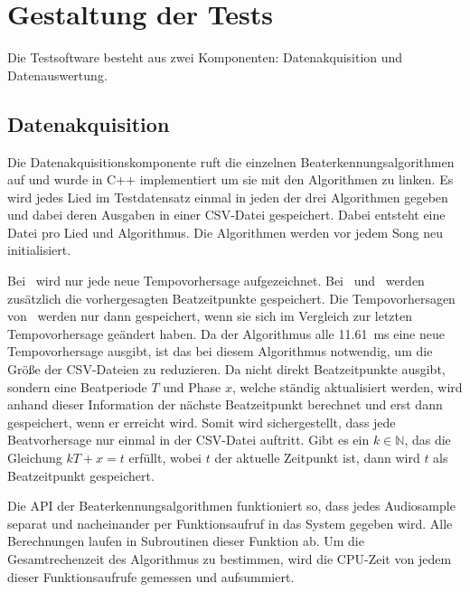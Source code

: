 \section{Gestaltung der Tests} \label{konzept/gestaltung}
{
	Die Testsoftware besteht aus zwei Komponenten:
		Datenakquisition und Datenauswertung.

	\subsection{Datenakquisition}
	{
		Die Datenakquisitionskomponente ruft die einzelnen Beaterkennungsalgorithmen auf
			und wurde in C++ implementiert
			um sie mit den Algorithmen zu linken.
		Es wird jedes Lied im Testdatensatz einmal in jeden der drei Algorithmen gegeben
			und dabei deren Ausgaben in einer CSV-Datei gespeichert.
		Dabei entsteht eine Datei pro Lied und Algorithmus.
		Die Algorithmen werden vor jedem Song neu initialisiert.

		Bei~\cite{2001_BeatThis} wird nur jede neue Tempovorhersage aufgezeichnet.
		Bei~\cite{2009_DaPlSt} und~\cite{2011_PlRoSt} werden zusätzlich die vorhergesagten Beatzeitpunkte gespeichert.
		Die Tempovorhersagen von~\cite{2011_PlRoSt} werden nur dann gespeichert,
			wenn sie sich im Vergleich zur letzten Tempovorhersage geändert haben.
		Da der Algorithmus alle \SI{11.61}{\milli\second} eine neue Tempovorhersage ausgibt,
			ist das bei diesem Algorithmus notwendig,
			um die Grö{\ss}e der CSV-Dateien zu reduzieren.
		Da \cite{2011_PlRoSt} nicht direkt Beatzeitpunkte ausgibt,
			sondern eine Beatperiode $T$ und Phase $x$,
			welche ständig aktualisiert werden,
			wird anhand dieser Information der nächste Beatzeitpunkt berechnet
			und erst dann gespeichert,
			wenn er erreicht wird.
		Somit wird sichergestellt,
			dass jede Beatvorhersage nur einmal in der CSV-Datei auftritt.
		Gibt es ein $k \in \mathbb{N}$, das die Gleichung $kT + x = t$ erfüllt,
			wobei $t$ der aktuelle Zeitpunkt ist,
			dann wird $t$ als Beatzeitpunkt gespeichert.

		Die API der Beaterkennungsalgorithmen funktioniert so,
			dass jedes Audiosample separat und nacheinander per Funktionsaufruf in das System gegeben wird.
		Alle Berechnungen laufen in Subroutinen dieser Funktion ab.
		Um die Gesamtrechenzeit des Algorithmus zu bestimmen,
			wird die CPU-Zeit von jedem dieser Funktionsaufrufe gemessen und aufsummiert.
	}

}
